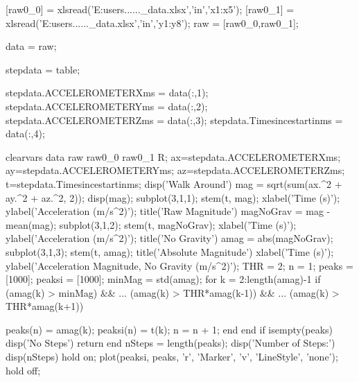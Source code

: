 %
%

[raw0_0] = xlsread('E:users......\step_data.xlsx','in','x1:x5');
[raw0_1] = xlsread('E:users......\step_data.xlsx','in','y1:y8');
raw = [raw0_0,raw0_1];

data = raw;

stepdata = table;

stepdata.ACCELEROMETERXms = data(:,1);
stepdata.ACCELEROMETERYms = data(:,2);
stepdata.ACCELEROMETERZms = data(:,3);
stepdata.Timesincestartinms = data(:,4);

clearvars data raw raw0_0 raw0_1 R;
ax=stepdata.ACCELEROMETERXms;
ay=stepdata.ACCELEROMETERYms;
az=stepdata.ACCELEROMETERZms;
t=stepdata.Timesincestartinms;
disp('Walk Around')
mag = sqrt(sum(ax.^2 + ay.^2 + az.^2, 2));
disp(mag);
subplot(3,1,1);
stem(t, mag);
xlabel('Time (s)');
ylabel('Acceleration (m/s^2)');
title('Raw Magnitude')
magNoGrav = mag - mean(mag);
subplot(3,1,2);
stem(t, magNoGrav);
xlabel('Time (s)');
ylabel('Acceleration (m/s^2)');
title('No Gravity')
amag = abs(magNoGrav);
subplot(3,1,3);
stem(t, amag);
title('Absolute Magnitude')
xlabel('Time (s)');
ylabel('Acceleration Magnitude, No Gravity (m/s^2)');
THR = 2;
n = 1;
peaks = [1000];
peaksi = [1000];
minMag = std(amag);
for k = 2:length(amag)-1
 if (amag(k) > minMag) && ... 
 (amag(k) > THR*amag(k-1)) && ... 
 (amag(k) > THR*amag(k+1))

 peaks(n) = amag(k);
 peaksi(n) = t(k);
 n = n + 1;
 end
end
if isempty(peaks)
 disp('No Steps')
 return
end
nSteps = length(peaks);
disp('Number of Steps:')
disp(nSteps)
hold on;
plot(peaksi, peaks, 'r', 'Marker', 'v', 'LineStyle', 'none');
hold off;
